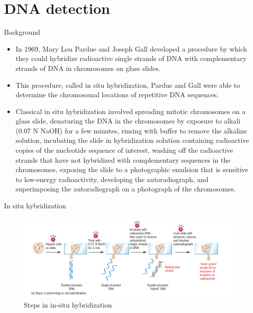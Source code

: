 \documentclass[
  ignorenonframetext,
  aspectratio=169]{beamer}
\providecommand{\tightlist}{%
  \setlength{\itemsep}{0pt}\setlength{\parskip}{0pt}}
\begin{document}
\hypertarget{dna-detection}{%
\section{DNA detection}\label{dna-detection}}

\begin{frame}{Background}
\protect\hypertarget{background}{}
\begin{itemize}
\tightlist
\item
  In 1969, Mary Lou Pardue and Joseph Gall developed a procedure by
  which they could hybridize radioactive single strands of DNA with
  complementary strands of DNA in chromosomes on glass slides.
\item
  This procedure, called in situ hybridization, Pardue and Gall were
  able to determine the chromosomal locations of repetitive DNA
  sequences.
\item
  Classical in situ hybridization involved spreading mitotic chromosomes
  on a glass slide, denaturing the DNA in the chromosomes by exposure to
  alkali (0.07 N NaOH) for a few minutes, rinsing with buffer to remove
  the alkaline solution, incubating the slide in hybridization solution
  containing radioactive copies of the nucleotide sequence of interest,
  washing off the radioactive strands that have not hybridized with
  complementary sequences in the chromosomes, exposing the slide to a
  photographic emulsion that is sensitive to low-energy radioactivity,
  developing the autoradiograph, and superimposing the autoradiograph on
  a photograph of the chromosomes.
\end{itemize}
\end{frame}

\begin{frame}{In situ hybridization}
\protect\hypertarget{in-situ-hybridization}{}
\begin{figure}
\includegraphics[width=0.65\linewidth]{./../images/insitu_hybrid_steps} \caption{Steps in in-situ hybridization}\label{fig:insitu-hybridization}
\end{figure}
\end{frame}
\end{document}
